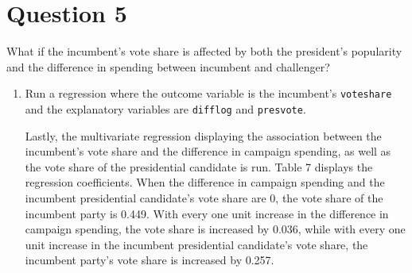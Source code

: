 \documentclass[12pt,letterpaper]{article}
\begin{document}
\section*{Question 5}
\noindent What if the incumbent's vote share is affected by both the president's popularity and the difference in spending between incumbent and challenger? 
	\begin{enumerate}
		\item Run a regression where the outcome variable is the incumbent's \texttt{voteshare} and the explanatory variables are \texttt{difflog} and \texttt{presvote}.	\vspace{.5cm}
		
		Lastly, the multivariate regression displaying the association between the incumbent's vote share and the difference in campaign spending, as well as the vote share of the presidential candidate is run. Table 7 displays the regression coefficients. When the difference in campaign spending and the incumbent presidential candidate's vote share are 0, the vote share of the incumbent party is 0.449. With every one unit increase in the difference in campaign spending, the vote share is increased by 0.036, while with every one unit increase in the incumbent presidential candidate's vote share, the incumbent party's vote share is increased by 0.257.
		

\end{enumerate}
\end{document}
